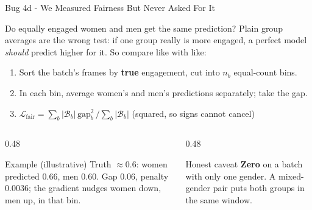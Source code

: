 \documentclass[aspectratio=169]{beamer}
\begin{document}
	\begin{frame}{Bug 4d - We Measured Fairness But Never Asked For It}
		\begin{block}{Do equally engaged women and men get the same prediction?}
			\small
			Plain group averages are the wrong test: if one group really is more engaged, a
			perfect model \emph{should} predict higher for it. So compare like with like:
			\small
			\begin{enumerate}
				\item Sort the batch's frames by \textbf{true} engagement, cut into $n_b$ equal-count bins.
				\item In each bin, average women's and men's predictions separately; take the gap.
				\item $\mathcal{L}_{\text{fair}} = \sum_b |\mathcal{B}_b|\,\text{gap}_b^2 \,\big/ \sum_b |\mathcal{B}_b|$
				\; (squared, so signs cannot cancel)
			\end{enumerate}
		\end{block}
		\begin{columns}[onlytextwidth]
			\begin{column}{0.48\textwidth}
				\begin{block}{Example (illustrative)}
					\small
					Truth $\approx 0.6$: women predicted $0.66$, men $0.60$. Gap $0.06$,
					penalty $0.0036$; the gradient nudges women down, men up, in that bin.
				\end{block}
			\end{column}
			\begin{column}{0.48\textwidth}
				\begin{alertblock}{Honest caveat}
					\small
					\textbf{Zero} on a batch with only one gender. A mixed-gender pair puts both
					groups in the same window.
				\end{alertblock}
			\end{column}
		\end{columns}
	\end{frame}
\end{document}
